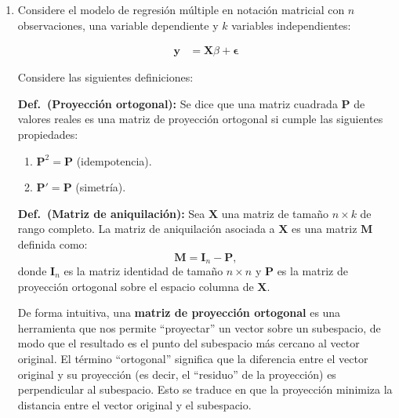 \documentclass[a4paper, answers, addpoints, 11pt]{exam}
\begin{document}
\begin{enumerate}
    \item Considere el modelo de regresión múltiple en notación matricial con \(n\) observaciones, una variable dependiente y \(k\) variables independientes:
    
    \begin{align}\label{EQ:modelInicial}
        \mathbf{y} &= \mathbf{X}\beta + \boldsymbol\epsilon
    \end{align}

    Considere las siguientes definiciones: \\ 
    
    \begin{mdframed}
        \textbf{Def.\ (Proyección ortogonal):} Se dice que una matriz cuadrada \( \mathbf{P} \) de valores reales es una matriz de proyección ortogonal si cumple las siguientes propiedades:
        \begin{enumerate}
            \item \( \mathbf{P}^2 = \mathbf{P} \) (idempotencia).
            \item \( \mathbf{P}' = \mathbf{P} \) (simetría).
        \end{enumerate}
    \end{mdframed}
    \vspace{1em}
    
    \begin{mdframed}
    \textbf{Def.\ (Matriz de aniquilación):} Sea \( \mathbf{X} \) una matriz de tamaño \( n \times k \) de rango completo. La matriz de aniquilación asociada a \( \mathbf{X} \) es una matriz \( \mathbf{M} \) definida como:
    \[
    \mathbf{M} = \mathbf{I}_n - \mathbf{P},
    \]
    donde \( \mathbf{I}_n \) es la matriz identidad de tamaño \( n \times n \) y \( \mathbf{P} \) es la matriz de proyección ortogonal sobre el espacio columna de \( \mathbf{X} \).
    \end{mdframed}
    \vspace{1em}
    
    De forma intuitiva, una \textbf{matriz de proyección ortogonal} es una herramienta que nos permite ``proyectar'' un vector sobre un subespacio, de modo que el resultado es el punto del subespacio más cercano al vector original. El término ``ortogonal'' significa que la diferencia entre el vector original y su proyección (es decir, el ``residuo'' de la proyección) es perpendicular al subespacio. Esto se traduce en que la proyección minimiza la distancia entre el vector original y el subespacio.
    

\end{enumerate}
\end{document}

